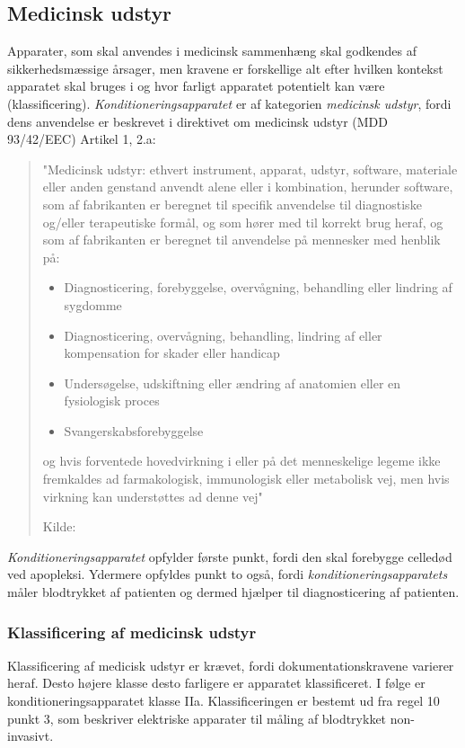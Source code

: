 \subsection{Medicinsk udstyr}
Apparater, som skal anvendes i medicinsk sammenhæng skal godkendes af sikkerhedsmæssige årsager, men kravene er forskellige alt efter hvilken kontekst apparatet skal bruges i og hvor farligt apparatet potentielt kan være (klassificering). \textit{Konditioneringsapparatet} er af kategorien \textit{medicinsk udstyr}, fordi dens anvendelse er beskrevet i direktivet om medicinsk udstyr (MDD 93/42/EEC) Artikel 1, 2.a:

\begin{quote}
	"Medicinsk udstyr: ethvert instrument, apparat, udstyr, software,
	materiale eller anden genstand anvendt alene eller i kombination,
	herunder software, som af fabrikanten er beregnet til specifik anvendelse
	til diagnostiske og/eller terapeutiske formål, og som hører med
	til korrekt brug heraf, og som af fabrikanten er beregnet til anvendelse
	på mennesker med henblik på:
	\begin{itemize}
		\item Diagnosticering, forebyggelse, overvågning, behandling eller
		lindring af sygdomme
		\item Diagnosticering, overvågning, behandling, lindring af eller
		kompensation for skader eller handicap
		\item Undersøgelse, udskiftning eller ændring af anatomien eller en
		fysiologisk proces
		\item Svangerskabsforebyggelse
	\end{itemize}
	
	og hvis forventede hovedvirkning i eller på det menneskelige
	legeme ikke fremkaldes ad farmakologisk, immunologisk eller metabolisk
	vej, men hvis virkning kan understøttes ad denne vej"
	
	Kilde: \cite{RefWorks:42}
\end{quote}

\textit{Konditioneringsapparatet} opfylder første punkt, fordi den skal forebygge celledød ved apopleksi. Ydermere opfyldes punkt to også, fordi \textit{konditioneringsapparatets} måler blodtrykket af patienten og dermed hjælper til diagnosticering af patienten.

\subsubsection{Klassificering af medicinsk udstyr}
Klassificering af medicisk udstyr er krævet, fordi dokumentationskravene varierer heraf. Desto højere klasse desto farligere er apparatet klassificeret. I følge \cite{RefWorks:42} er konditioneringsapparatet klasse IIa. Klassificeringen er bestemt ud fra regel 10 punkt 3, som beskriver elektriske apparater til måling af blodtrykket non-invasivt.

